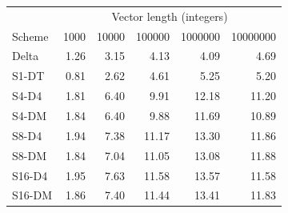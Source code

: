 \begin{tabular}{lrrrrr}
\toprule
 & \multicolumn{5}{c}{Vector length (integers)} \\
Scheme & 1000 & 10000 & 100000 & 1000000 & 10000000 \\
\midrule
Delta & 1.26 & 3.15 & 4.13 & 4.09 & 4.69 \\
S1-DT & 0.81 & 2.62 & 4.61 & 5.25 & 5.20 \\
S4-D4 & 1.81 & 6.40 & 9.91 & 12.18 & 11.20 \\
S4-DM & 1.84 & 6.40 & 9.88 & 11.69 & 10.89 \\
S8-D4 & 1.94 & 7.38 & 11.17 & 13.30 & 11.86 \\
S8-DM & 1.84 & 7.04 & 11.05 & 13.08 & 11.88 \\
S16-D4 & 1.95 & 7.63 & 11.58 & 13.57 & 11.58 \\
S16-DM & 1.86 & 7.40 & 11.44 & 13.41 & 11.83 \\
\bottomrule
\end{tabular}
